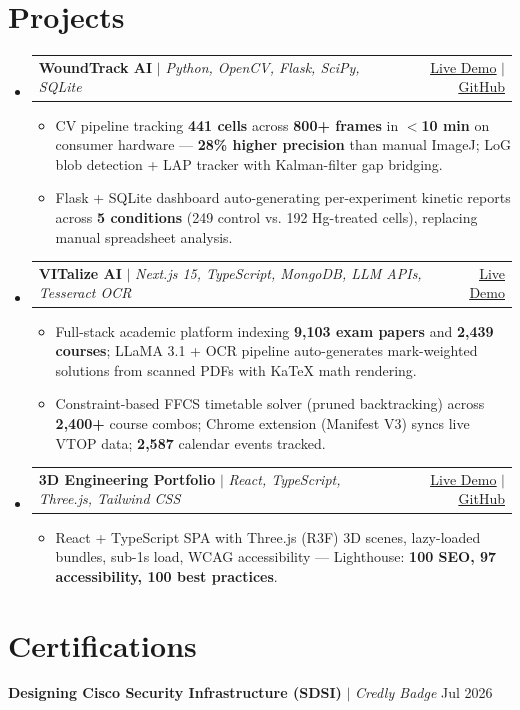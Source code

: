 \documentclass[letterpaper,11pt]{article}
\makeatletter
\newcommand{\resumeItem}[1]{
  \item\small{
    {#1 \vspace{-2pt}}
  }
}
\newcommand{\resumeProjectHeading}[2]{
    \item
    \begin{tabular*}{0.97\textwidth}{l@{\extracolsep{\fill}}r}
      \small#1 & #2 \\
    \end{tabular*}\vspace{-7pt}
}
\newcommand{\resumeSubHeadingListStart}{\begin{itemize}[leftmargin=0.15in, label={}]}
\newcommand{\resumeSubHeadingListEnd}{\end{itemize}}
\newcommand{\resumeItemListStart}{\begin{itemize}}
\newcommand{\resumeItemListEnd}{\end{itemize}\vspace{-5pt}}
\makeatother
\begin{document}
\section{Projects}
    \resumeSubHeadingListStart
      \resumeProjectHeading
          {\textbf{WoundTrack AI} $|$ \emph{Python, OpenCV, Flask, SciPy, SQLite}}{\href{https://xmananrastogi-woundtrackai.hf.space/}{\underline{Live Demo}} $|$ \href{https://github.com/xmananrastogi/WoundTrack-AI}{\underline{GitHub}}}
          \resumeItemListStart
            \resumeItem{CV pipeline tracking \textbf{441 cells} across \textbf{800+ frames} in \textbf{$<$10 min} on consumer hardware — \textbf{28\% higher precision} than manual ImageJ; LoG blob detection + LAP tracker with Kalman-filter gap bridging.}
            \resumeItem{Flask + SQLite dashboard auto-generating per-experiment kinetic reports across \textbf{5 conditions} (249 control vs. 192 Hg-treated cells), replacing manual spreadsheet analysis.}
          \resumeItemListEnd
      \resumeProjectHeading
          {\textbf{VITalize AI} $|$ \emph{Next.js 15, TypeScript, MongoDB, LLM APIs, Tesseract OCR}}{\href{https://vitalize-vit.vercel.app/}{\underline{Live Demo}}}
          \resumeItemListStart
            \resumeItem{Full-stack academic platform indexing \textbf{9,103 exam papers} and \textbf{2,439 courses}; LLaMA 3.1 + OCR pipeline auto-generates mark-weighted solutions from scanned PDFs with KaTeX math rendering.}
            \resumeItem{Constraint-based FFCS timetable solver (pruned backtracking) across \textbf{2,400+} course combos; Chrome extension (Manifest V3) syncs live VTOP data; \textbf{2,587} calendar events tracked.}
          \resumeItemListEnd
      \resumeProjectHeading
          {\textbf{3D Engineering Portfolio} $|$ \emph{React, TypeScript, Three.js, Tailwind CSS}}{\href{https://xmananrastogi.github.io/portfolio/}{\underline{Live Demo}} $|$ \href{https://github.com/xmananrastogi/portfolio}{\underline{GitHub}}}
          \resumeItemListStart
            \resumeItem{React + TypeScript SPA with Three.js (R3F) 3D scenes, lazy-loaded bundles, sub-1s load, WCAG accessibility — Lighthouse: \textbf{100 SEO, 97 accessibility, 100 best practices}.}
          \resumeItemListEnd
    \resumeSubHeadingListEnd

\section{Certifications}
 \begin{itemize}[leftmargin=0.15in, label={}]
    \small{\item{
     \textbf{Designing Cisco Security Infrastructure (SDSI)}{ $|$ \emph{Credly Badge}} \hfill Jul 2026
    }}
 \end{itemize}
\end{document}

